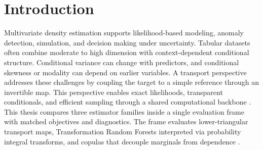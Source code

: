 \documentclass[11pt,a4paper,twoside]{book}\usepackage[]{graphicx}\usepackage[]{xcolor}
\begin{document}
\cleardoublepage
\mainmatter






\chapter{Introduction}\label{ch:intro}

Multivariate density estimation supports likelihood-based modeling, anomaly detection, simulation, and decision making under uncertainty. Tabular datasets often combine moderate to high dimension with context-dependent conditional structure. Conditional variance can change with predictors, and conditional skewness or modality can depend on earlier variables. A transport perspective addresses these challenges by coupling the target to a simple reference through an invertible map. This perspective enables exact likelihoods, transparent conditionals, and efficient sampling through a shared computational backbone \citep{rosenblatt1952remarks,knothe1957contributions}. This thesis compares three estimator families inside a single evaluation frame with matched objectives and diagnostics. The frame evaluates lower-triangular transport maps, Transformation Random Forests interpreted via probability integral transforms, and copulas that decouple marginals from dependence \citep{hothorn2017transformation,hothorn2018conditional,sklar1959fonctions}.
\medskip
\end{document}
